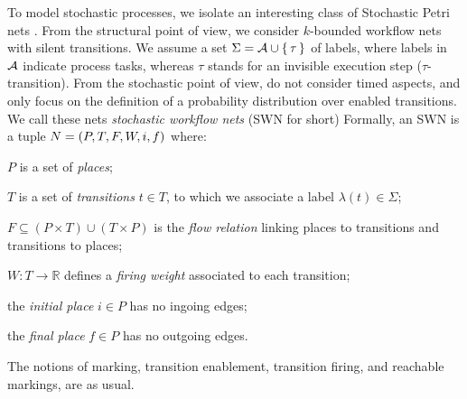 To model stochastic processes, we isolate an interesting class of Stochastic Petri nets \cite{MarsanCB84,Desel1998,RoggeSoltiAW13}. From the structural point of view, we consider $k$-bounded workflow nets with silent transitions. We assume a set $\Sigma = \mathcal{A} \cup \set{\tau}$ of labels, where labels in $\mathcal{A}$ indicate process tasks, whereas $\tau$ stands for an invisible execution step ($\tau$-transition). %
From the stochastic point of view, do not consider timed aspects, and only focus on the definition of a probability distribution over enabled transitions. We call these nets \emph{stochastic workflow nets} (SWN for short) 
Formally, an SWN is a tuple $N=(P,T,F,W,i,f)$ where:
\begin{mylist}
	\item $P$ is a set of \textit{places};
	\item $T$ is a set of \textit{transitions} $t\in T$, to which we associate a label $\lambda(t)\in\Sigma$;
	\item $F\subseteq (P\times T)\cup (T\times P)$ is the \emph{flow relation} linking places to transitions and transitions to places; %
	\item $W\colon T\to \mathbb{R}$ defines a \textit{firing weight} associated to each transition;
	\item the \emph{initial place} $i\in P$ has no ingoing edges; %
	\item the \emph{final place} $f\in P$ has no outgoing edges. %
\end{mylist}
The notions of marking, transition enablement, transition firing, and reachable markings, are as usual.

